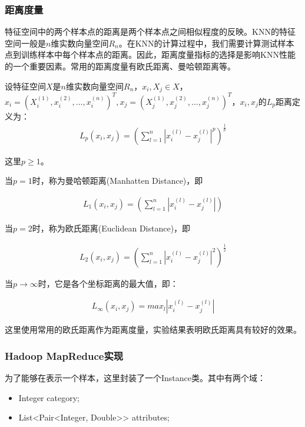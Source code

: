 \documentclass[lang=cn,11pt]{elegantpaper}
\begin{document}
\subsubsection{距离度量}
特征空间中的两个样本点的距离是两个样本点之间相似程度的反映。KNN的特征空间一般是$n$维实数向量空间$R_n$。在KNN的计算过程中，我们需要计算测试样本点到训练样本中每个样本点的距离。因此，距离度量指标的选择是影响KNN性能的一个重要因素。常用的距离度量有欧氏距离、曼哈顿距离等。\par
设特征空间$X$是$n$维实数向量空间$R_n$，$x_i, X_j\in X$，$x_i=(X_i^{(1)},x_i^{(2)}, ..., x_i^{(n)})^T, x_j=(X_j^{(1)},x_j^{(2)}, ..., x_j^{(n)})^T$，$x_i, x_j$的$L_p$距离定义为：
\begin{align*}
	L_p(x_i, x_j) = (\sum_{l=1}^n|x_i^{(l)}-x_j^{(l)}|^p)^{\frac{1}{p}}
\end{align*}

这里$p\geq 1$。\par
当$p=1$时，称为曼哈顿距离(Manhatten Distance)，即\par
\begin{align*}
	L_1(x_i, x_j) = (\sum_{l=1}^n|x_i^{(l)}-x_j^{(l)}|)
\end{align*}

当$p=2$时，称为欧氏距离(Euclidean Distance)，即\par
\begin{align*}
	L_2(x_i, x_j) = (\sum_{l=1}^n|x_i^{(l)}-x_j^{(l)}|^2)^{\frac{1}{2}}
\end{align*}

当$p\rightarrow \infty$时，它是各个坐标距离的最大值，即：\par
\begin{align*}
	L_\infty(x_i, x_j) = max_l|x_i^{(l)}-x_j^{(l)}|
\end{align*}

这里使用常用的欧氏距离作为距离度量，实验结果表明欧氏距离具有较好的效果。

\subsubsection{Hadoop MapReduce实现}
为了能够在表示一个样本，这里封装了一个Instance类。其中有两个域：\par
\begin{itemize}
	\item Integer category;
	\item List<Pair<Integer, Double>> attributes; 
\end{itemize}
\end{document}
